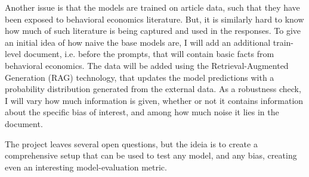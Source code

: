 \documentclass[12pt]{article}
\begin{document}
Another issue is that the models are trained on article data, such that they have been exposed to behavioral economics literature. But, it is similarly hard to know how much of such literature is being captured and used in the responses. To give an initial idea of how naive the base models are, I will add an additional train-level document, i.e. before the prompts, that will contain basic facts from behavioral economics. The data will be added using the Retrieval-Augmented Generation (RAG) technology, that updates the model predictions with a probability distribution generated from the external data. As a robustness check, I will vary how much information is given, whether or not it contains information about the specific bias of interest, and among how much noise it lies in the document.

The project leaves several open questions, but the ideia is to create a comprehensive setup that can be used to test any model, and any bias, creating even an interesting model-evaluation metric.


\newpage
\printbibliography
\end{document}
